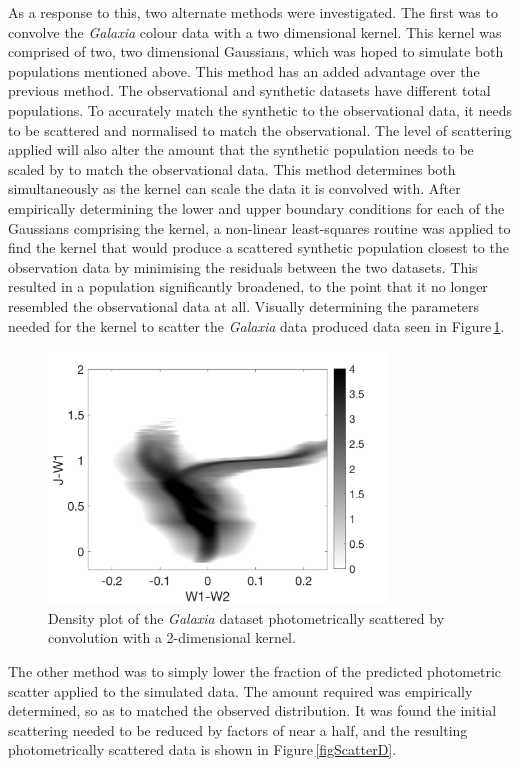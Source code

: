 As a response to this, two alternate methods were investigated. The first was to convolve the {\em Galaxia} colour data with a two dimensional kernel. This kernel was comprised of two, two dimensional Gaussians, which was hoped to simulate both populations mentioned above. This method has an added advantage over the previous method. The observational and synthetic datasets have different total populations. To accurately match the synthetic to the observational data, it needs to be scattered and normalised to match the observational. The level of scattering applied will also alter the amount that the synthetic population needs to be scaled by to match the observational data. This method determines both simultaneously as the kernel can scale the data it is convolved with. After empirically determining the lower and upper boundary conditions for each of the Gaussians comprising the kernel, a non-linear least-squares routine was applied to find the kernel that would produce a scattered synthetic population closest to the observation data by minimising the residuals between the two datasets. This resulted in a population significantly broadened, to the point that it no longer resembled the observational data at all. Visually determining the parameters needed for the kernel to scatter the {\em Galaxia} data produced data seen in Figure\,\ref{figKernel}.\\

\begin{figure}[!ht]
	\centering
    \includegraphics[width=0.8\textwidth]{Kernel.png}
    \caption{Density plot of the {\em Galaxia} dataset photometrically scattered by convolution with a 2-dimensional kernel.}
    \label{figKernel}
\end{figure}

The other method was to simply lower the fraction of the predicted photometric scatter applied to the simulated data. The amount required was empirically determined, so as to matched the observed distribution. It was found the initial scattering needed to be reduced by factors of near a half, and the resulting photometrically scattered data is shown in Figure\,\ref{figScatterD}.\\

